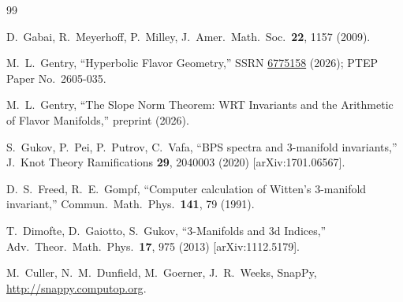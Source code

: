 \documentclass[11pt,a4paper]{article}
\theoremstyle{definition}
\theoremstyle{remark}
\begin{document}
\begin{thebibliography}{99}

D.~Gabai, R.~Meyerhoff, P.~Milley,
J.\ Amer.\ Math.\ Soc.\ \textbf{22}, 1157 (2009).

M.~L.~Gentry,
``Hyperbolic Flavor Geometry,''
SSRN \href{https://doi.org/10.2139/ssrn.6775158}{6775158} (2026);
PTEP Paper No.\ 2605-035.

M.~L.~Gentry,
``The Slope Norm Theorem: WRT Invariants and the Arithmetic
of Flavor Manifolds,'' preprint (2026).

S.~Gukov, P.~Pei, P.~Putrov, C.~Vafa,
``BPS spectra and 3-manifold invariants,''
J.\ Knot Theory Ramifications \textbf{29}, 2040003 (2020)
[arXiv:1701.06567].

D.~S.~Freed, R.~E.~Gompf,
``Computer calculation of Witten's 3-manifold invariant,''
Commun.\ Math.\ Phys.\ \textbf{141}, 79 (1991).

T.~Dimofte, D.~Gaiotto, S.~Gukov,
``3-Manifolds and 3d Indices,''
Adv.\ Theor.\ Math.\ Phys.\ \textbf{17}, 975 (2013)
[arXiv:1112.5179].

M.~Culler, N.~M.~Dunfield, M.~Goerner, J.~R.~Weeks,
SnapPy, \url{http://snappy.computop.org}.

\end{thebibliography}
\end{document}

